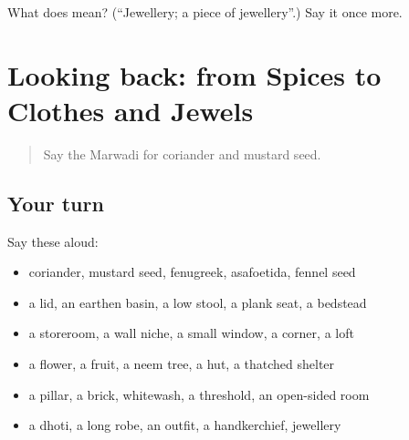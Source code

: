 \begin{tcolorbox}[breakable,colback=teal!4,colframe=teal!35!black,title={Before you move on}]
What does  mean? (\textquotedblleft{}Jewellery; a piece of jewellery\textquotedblright{}.) Say it once more.
\end{tcolorbox}
\section[(dialogue)]{Looking back: from Spices to Clothes and Jewels}

\label{lesson:MW-R190-review-185-190}



\begin{quote}
Say the Marwadi for coriander and mustard seed.
\end{quote}

\subsection*{Your turn}
Say these aloud:

\begin{itemize}
\raggedright
  \item coriander, mustard seed, fenugreek, asafoetida, fennel seed
  \item a lid, an earthen basin, a low stool, a plank seat, a bedstead
  \item a storeroom, a wall niche, a small window, a corner, a loft
  \item a flower, a fruit, a neem tree, a hut, a thatched shelter
  \item a pillar, a brick, whitewash, a threshold, an open-sided room
  \item a dhoti, a long robe, an outfit, a handkerchief, jewellery
\end{itemize}

